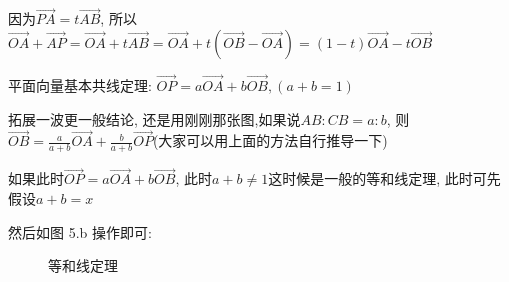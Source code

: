 \documentclass{book}
\begin{document}
    因为$\overrightarrow{PA}=t\overrightarrow{AB}$, 所以$\overrightarrow{OA}+\overrightarrow{AP}=\overrightarrow{OA}+t\overrightarrow{AB}=\overrightarrow{OA}+t(\overrightarrow{OB}-\overrightarrow{OA})=(1-t)\overrightarrow{OA}-t\overrightarrow{OB}$

    \textcolor[rgb]{0.38,0.11,0.2}{平面向量基本共线定理}: $\overrightarrow{OP}=a\overrightarrow{OA}+b\overrightarrow{OB},(a+b=1)$

    拓展一波更一般结论, 还是用刚刚那张图,如果说$AB:CB=a:b$, 则$\displaystyle \overrightarrow{OB}=\frac{a}{a+b}\overrightarrow{OA}+\frac{b}{a+b}\overrightarrow{OP}$(大家可以用上面的方法自行推导一下)

    如果此时$\overrightarrow{OP}=a\overrightarrow{OA}+b\overrightarrow{OB}$, 此时$a+b\neq 1$这时候是一般的\textcolor[rgb]{0.38,0.11,0.2}{等和线定理}, 此时可先假设$a+b=x$

    然后如图 5.b 操作即可:
    \begin{figure}[htbp]    %
        \centering            %
        \caption{等和线定理}    %
        \label{fig:subfig_1}            %
    \end{figure}
\end{document}
